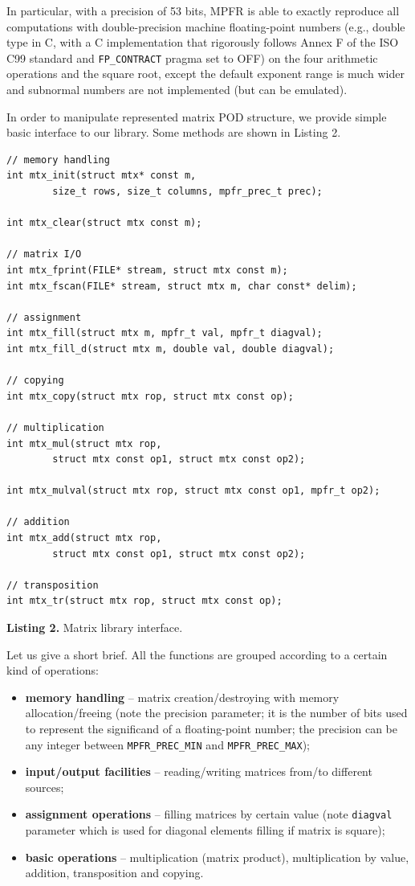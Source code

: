 \documentclass[runningheads,a4paper]{llncs}
\begin{document}
In particular, with a precision of 53 bits, MPFR is able to exactly reproduce all computations with double-precision machine floating-point numbers (e.g., double type in C, with a C implementation that rigorously follows Annex F of the ISO C99 standard and \texttt{FP\_CONTRACT} pragma set to OFF) on the four arithmetic operations and the square root, except the default exponent range is much wider and subnormal numbers are not implemented (but can be emulated).

In order to manipulate represented matrix POD structure, we provide simple basic interface to our library. Some methods are shown in Listing 2.

\begin{verbatim}
// memory handling
int mtx_init(struct mtx* const m,
        size_t rows, size_t columns, mpfr_prec_t prec);

int mtx_clear(struct mtx const m);

// matrix I/O
int mtx_fprint(FILE* stream, struct mtx const m);
int mtx_fscan(FILE* stream, struct mtx m, char const* delim);

// assignment
int mtx_fill(struct mtx m, mpfr_t val, mpfr_t diagval);
int mtx_fill_d(struct mtx m, double val, double diagval);

// copying
int mtx_copy(struct mtx rop, struct mtx const op);

// multiplication
int mtx_mul(struct mtx rop,
        struct mtx const op1, struct mtx const op2);

int mtx_mulval(struct mtx rop, struct mtx const op1, mpfr_t op2);

// addition
int mtx_add(struct mtx rop,
        struct mtx const op1, struct mtx const op2);

// transposition
int mtx_tr(struct mtx rop, struct mtx const op);
\end{verbatim}
%
\noindent
{\small\textbf{Listing 2.} Matrix library interface.\bigskip}

Let us give a short brief. All the functions are grouped according to a certain kind of operations:
\begin{itemize}
\item\textbf{memory handling} -- matrix creation/destroying with memory allocation/freeing (note the precision parameter; it is the number of bits used to represent the significand of a floating-point number; the precision can be any integer between \texttt{MPFR\_PREC\_MIN} and \texttt{MPFR\_PREC\_MAX});
\item\textbf{input/output facilities} -- reading/writing matrices from/to different sources;
\item\textbf{assignment operations} -- filling matrices by certain value (note \texttt{diagval} parameter which is used for diagonal elements filling if matrix is square);
\item\textbf{basic operations} -- multiplication (matrix product), multiplication by value, addition, transposition and copying.
\end{itemize}
\end{document}
